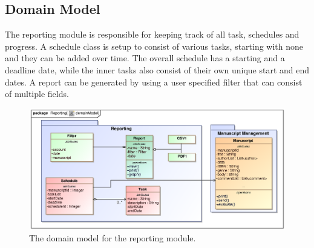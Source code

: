 \begin{enumerate}
\newpage
\subsection{Domain Model}
\par{The reporting module is responsible for keeping track of all task, schedules and progress. A schedule class is setup to consist of various tasks, starting with none and they can be added over time. The overall schedule has a starting and a deadline date, while the inner tasks also consist of their own unique start and end dates. A report can be generated by using a user specified filter that can consist of multiple fields.}

\begin{figure}[h]
\includegraphics[height=200px, width=500px]{epsImages/DomainModels/Reporting.eps}
\caption{The domain model for the reporting module.}
\end{figure}
\newpage

\end{enumerate}

